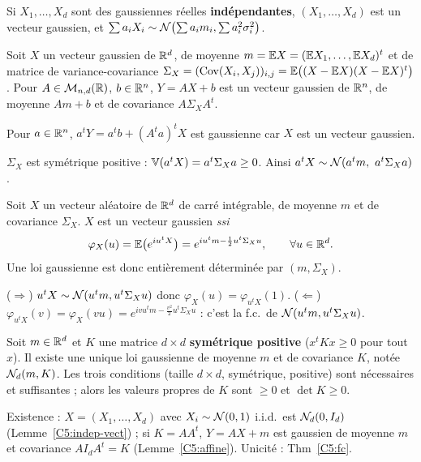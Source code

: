 \documentclass[11pt,a4paper]{article}
\begin{document}
\begin{lemme}\label{C5:indep-vect}
Si $X_1,\dots,X_d$ sont des gaussiennes réelles \textbf{indépendantes}, $(X_1,\dots,X_d)$ est un vecteur gaussien, et
$\sum a_iX_i\sim\mathcal{N}\bigl(\sum a_im_i,\sum a_i^2\sigma_i^2\bigr)$.
\end{lemme}

\begin{lemme}\label{C5:affine}
Soit $X$ un vecteur gaussien de $\mathbb{R}^d$, de moyenne $m=\mathbb{E} X=(\mathbb{E} X_1,\dots,\mathbb{E} X_d)^t$ et de matrice de variance-covariance
$\Sigma_X=(\operatorname{Cov}(X_i,X_j))_{i,j}=\mathbb{E}\bigl((X-\mathbb{E} X)(X-\mathbb{E} X)^t\bigr)$. Pour $A\in\mathcal M_{n,d}(\mathbb{R})$, $b\in\mathbb{R}^n$,
$Y=AX+b$ est un vecteur gaussien de $\mathbb{R}^n$, de moyenne $Am+b$ et de covariance $A\Sigma_XA^t$.
\end{lemme}
\begin{idee}
Pour $a\in\mathbb{R}^n$, $a^tY=a^tb+(A^ta)^tX$ est gaussienne car $X$ est un vecteur gaussien.
\end{idee}

\begin{remarque}[standard]
$\Sigma_X$ est symétrique positive : $\operatorname{\mathbb{V}}(a^tX)=a^t\Sigma_Xa\ge0$. Ainsi $a^tX\sim\mathcal{N}(a^tm,\ a^t\Sigma_Xa)$.
\end{remarque}

\begin{theoreme}\label{C5:fc}
Soit $X$ un vecteur aléatoire de $\mathbb{R}^d$ de carré intégrable, de moyenne $m$ et de covariance $\Sigma_X$. $X$ est un vecteur gaussien \emph{ssi}
\[\varphi_X(u)=\mathbb{E}\bigl(e^{iu^tX}\bigr)=e^{iu^tm-\frac12u^t\Sigma_Xu},\qquad\forall u\in\mathbb{R}^d.\]
Une loi gaussienne est donc entièrement déterminée par $(m,\Sigma_X)$.
\end{theoreme}
\begin{idee}
($\Rightarrow$) $u^tX\sim\mathcal{N}(u^tm,u^t\Sigma_Xu)$ donc $\varphi_X(u)=\varphi_{u^tX}(1)$.
($\Leftarrow$) $\varphi_{u^tX}(v)=\varphi_X(vu)=e^{ivu^tm-\frac{v^2}2u^t\Sigma_Xu}$ : c'est la f.c.\ de $\mathcal{N}(u^tm,u^t\Sigma_Xu)$.
\end{idee}

\begin{theoreme}\label{C5:existence}
Soit $m\in\mathbb{R}^d$ et $K$ une matrice $d\times d$ \textbf{symétrique positive} ($x^tKx\ge0$ pour tout $x$).
Il existe une unique loi gaussienne de moyenne $m$ et de covariance $K$, notée $\mathcal{N}_d(m,K)$. Les trois conditions
(taille $d\times d$, symétrique, positive) sont nécessaires et suffisantes ; alors les valeurs propres de $K$ sont $\ge0$ et $\det K\ge0$.
\end{theoreme}
\begin{idee}
Existence : $X=(X_1,\dots,X_d)$ avec $X_i\sim\mathcal{N}(0,1)$ i.i.d.\ est $\mathcal{N}_d(0,I_d)$ (Lemme~\ref{C5:indep-vect}) ; si $K=AA^t$,
$Y=AX+m$ est gaussien de moyenne $m$ et covariance $AI_dA^t=K$ (Lemme~\ref{C5:affine}). Unicité : Thm~\ref{C5:fc}.
\end{idee}
\end{document}
